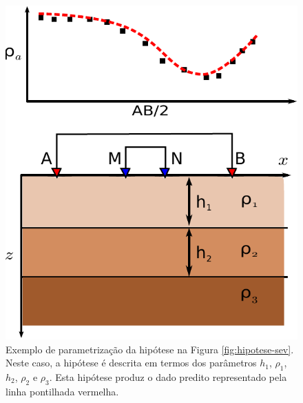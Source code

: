 \begin{figure}
    \centering
    \includegraphics[scale=0.7]{figs/params-sev}
    \caption{Exemplo de parametrização da hipótese na Figura
    \ref{fig:hipotese-sev}. Neste caso, a hipótese é descrita em termos
    dos parâmetros $h_1$, $\rho_1$, $h_2$, $\rho_2$ e $\rho_3$.
    Esta hipótese produz o dado predito
    representado pela linha pontilhada vermelha.}
    \label{fig:params-sev}
\end{figure}
